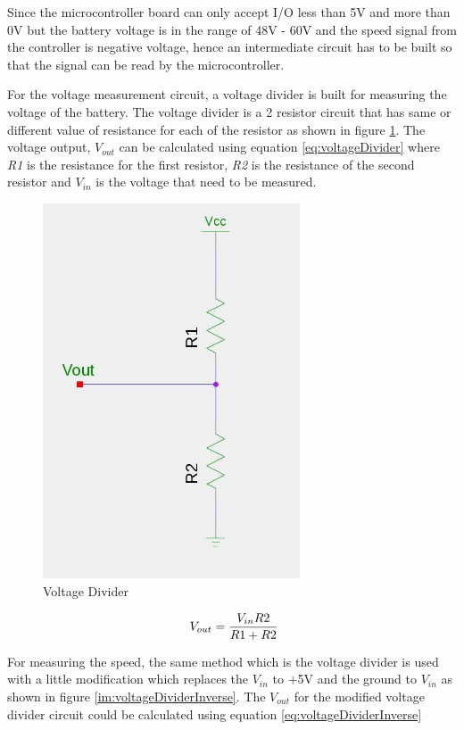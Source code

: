 Since the microcontroller board can only accept I/O less than 5V and more than 0V but the battery voltage is in the range of 48V - 60V and the speed signal from the controller is negative voltage, hence an intermediate circuit has to be built so that the signal can be read by the microcontroller.

For the voltage measurement circuit, a voltage divider is built for measuring the voltage of the battery. The voltage divider is a 2 resistor circuit that has same or different value of resistance for each of the resistor as shown in figure \ref{im:voltageDivider}. The voltage output, \textit{$V_{out}$} can be calculated using equation \ref{eq:voltageDivider} where \textit{R1} is the resistance for the first resistor, \textit{R2} is the resistance of the second resistor and \textit{$V_{in}$} is the voltage that need to be measured.

\begin{figure}[htb]
	\centering
	\includegraphics[width=3in]{images/voltage_divider.jpg}
	\caption{Voltage Divider}
	\label{im:voltageDivider}
\end{figure}

\begin{equation}
	\label{eq:voltageDivider}
	\text{\myequations{Voltage Divider}}
	V_{out} = \frac{V_{in}R2}{R1+R2}
\end{equation}

For measuring the speed, the same method which is the voltage divider is used with a little modification which replaces the \textit{$V_{in}$} to +5V and the ground to \textit{$V_{in}$} as shown in figure \ref{im:voltageDividerInverse}. The \textit{$V_{out}$} for the modified voltage divider circuit could be calculated using equation \ref{eq:voltageDividerInverse}

